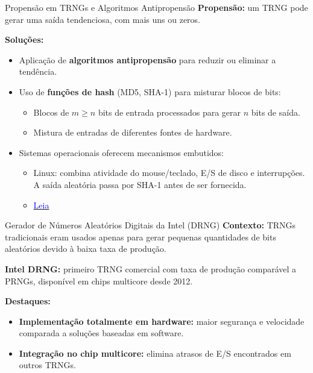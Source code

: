 \begin{frame}{Propensão em TRNGs e Algoritmos Antipropensão}
    \textbf{Propensão:} um TRNG pode gerar uma saída tendenciosa, com mais uns ou zeros.

    \textbf{Soluções:}
    \begin{itemize}
        \item Aplicação de \textbf{algoritmos antipropensão} para reduzir ou eliminar a tendência.
        \item Uso de \textbf{funções de hash} (MD5, SHA-1) para misturar blocos de bits:
              \begin{itemize}
                  \item Blocos de $m \ge n$ bits de entrada processados para gerar $n$ bits de saída.
                  \item Mistura de entradas de diferentes fontes de hardware.
              \end{itemize}
        \item Sistemas operacionais oferecem mecanismos embutidos:
              \begin{itemize}
                  \item Linux: combina atividade do mouse/teclado, E/S de disco e interrupções. A saída aleatória passa por SHA-1 antes de ser fornecida.

                  \item \href{https://man.archlinux.org/man/urandom.4.en}{\textcolor{blue}{Leia}}
              \end{itemize}
    \end{itemize}

\end{frame}

\begin{frame}{Gerador de Números Aleatórios Digitais da Intel (DRNG)}
    \textbf{Contexto:} TRNGs tradicionais eram usados apenas para gerar pequenas quantidades de bits aleatórios devido à baixa taxa de produção.

    \textbf{Intel DRNG:} primeiro TRNG comercial com taxa de produção comparável a PRNGs, disponível em chips multicore desde 2012.

    \textbf{Destaques:}
    \begin{itemize}
        \item \textbf{Implementação totalmente em hardware:} maior segurança e velocidade comparada a soluções baseadas em software.
        \item \textbf{Integração no chip multicore:} elimina atrasos de E/S encontrados em outros TRNGs.
    \end{itemize}

\end{frame}

